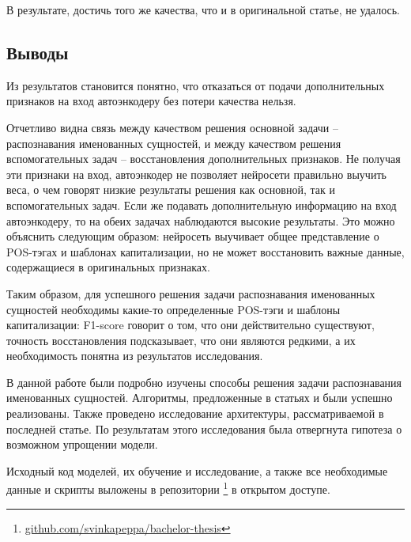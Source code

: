 \documentclass[a4paper,14pt]{extarticle}
\newcommand{\printbib}{
    \anonsection{Список использованных источников}
    \printbibliography[heading=none]
}
\begin{document}
В результате, достичь того же качества, что и в оригинальной статье, не удалось.

\subsection{Выводы}

Из результатов становится понятно, что отказаться от подачи дополнительных признаков на вход автоэнкодеру без потери качества нельзя.

Отчетливо видна связь между качеством решения основной задачи -- распознавания именованных сущностей, и между качеством решения вспомогательных задач -- восстановления дополнительных признаков. Не получая эти признаки на вход, автоэнкодер не позволяет нейросети правильно выучить веса, о чем говорят низкие результаты решения как основной, так и вспомогательных задач. Если же подавать дополнительную информацию на вход автоэнкодеру, то на обеих задачах наблюдаются высокие результаты. Это можно объяснить следующим образом: нейросеть выучивает общее представление о POS-тэгах и шаблонах капитализации, но не может восстановить важные данные, содержащиеся в оригинальных признаках.

Таким образом, для успешного решения задачи распознавания именованных сущностей необходимы какие-то определенные POS-тэги и шаблоны капитализации: F1-score говорит о том, что они действительно существуют, точность восстановления подсказывает, что они являются редкими, а их необходимость понятна из результатов исследования.

\clearpage


В данной работе были подробно изучены способы решения задачи распознавания именованных сущностей. Алгоритмы, предложенные в статьях \cite{1603.01354} и \cite{1808.09075} были успешно реализованы. Также проведено исследование архитектуры, рассматриваемой в последней статье. По результатам этого исследования была отвергнута гипотеза о возможном упрощении модели.

Исходный код моделей, их обучение и исследование, а также все необходимые данные и скрипты выложены в репозитории \footnote{\href{https://github.com/svinkapeppa/bachelor-thesis}{github.com/svinkapeppa/bachelor-thesis}} в открытом доступе.

\clearpage

\printbib
\end{document}
